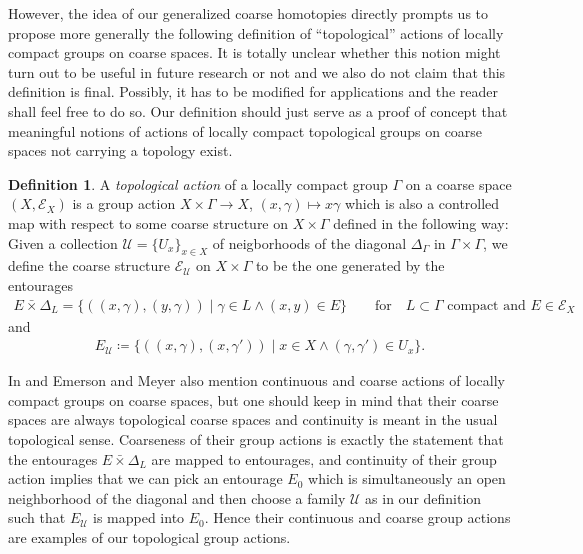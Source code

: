 \documentclass[pdftex]{sigma}
\numberwithin{equation}{section}
\theoremstyle{definition}
\newtheorem{defn}[thm]{Definition}
\newcommand{\cU}{\mathcal{U}}
\newcommand{\coarseStr}{\mathcal{E}}
\newcommand{\Diag}[1][]{{\Delta_{#1}}}
\newcommand{\swapcross}{\mathbin{\bar\times}}
\begin{document}
However, the idea of our generalized coarse homotopies directly prompts us to propose more generally the following definition of ``topological'' actions of locally compact groups on coarse spaces.
It is totally unclear whether this notion might turn out to be useful in future research or not and we also do not claim that this definition is final.
Possibly, it has to be modified for applications and the reader shall feel free to do so.
Our definition should just serve as a proof of concept that meaningful notions of actions of locally compact topological groups on coarse spaces not carrying a topology exist.

\begin{defn}\label{defn:coarsegroupaction}
A \emph{topological action} of a locally compact group $\Gamma$ on a coarse space $(X,\coarseStr_X)$ is a group action $X\times\Gamma\to X$, $(x,\gamma)\mapsto x\gamma$ which is also a controlled map with respect to some coarse structure on $X\times\Gamma$ defined in the following way:
Given a collection $\cU= \{U_x\}_{x\in X}$ of neigborhoods of the diagonal $\Diag[\Gamma]$ in $\Gamma\times \Gamma$, we define the coarse structure $\coarseStr_{\cU}$ on $X\times\Gamma$ to be the one generated by the entourages
\begin{gather*}
E\swapcross \Diag[L]=\{((x,\gamma),(y,\gamma))\mid \gamma\in L \wedge (x,y)\in E\}\qquad
\text{for}\quad L\subset \Gamma\text{ compact and } E\in\coarseStr_X
\end{gather*}
and
\begin{gather*}
E_{\cU}\coloneqq\{((x,\gamma),(x,\gamma'))\mid x\in X\wedge (\gamma,\gamma')\in U_x\}.
\end{gather*}
\end{defn}

In \cite[Section 2.1]{EmeMeyDescent} and \cite[Section 2.2]{EmeMeyEquivariantCoassembly} Emerson and Meyer also mention continuous and coarse actions of locally compact groups on coarse spaces, but one should keep in mind that their coarse spaces are always topological coarse spaces and continuity is meant in the usual topological sense. Coarseness of their group actions is exactly the statement that the entourages $E\swapcross \Diag[L]$ are mapped to entourages, and continuity of their group action implies that we can pick an entourage $E_0$ which is simultaneously an open neighborhood of the diagonal and then choose a family $\cU$ as in our definition such that $E_{\cU}$ is mapped into $E_0$.
Hence their continuous and coarse group actions are examples of our topological group actions.
\end{document}
